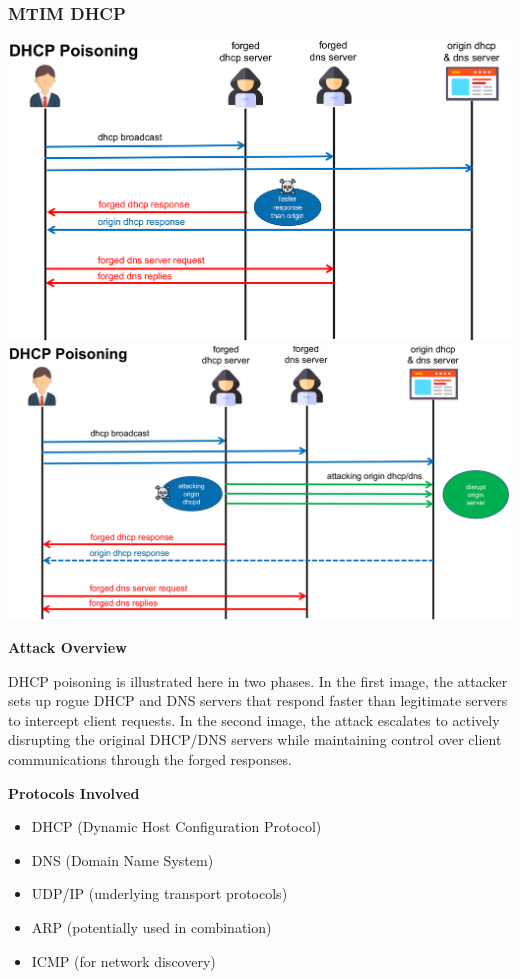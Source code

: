 \subsubsection{MTIM DHCP}
\begin{center}
\includegraphics[width=\textwidth]{resources/07-dhcp-1.png}
\includegraphics[width=\textwidth]{resources/07-dhcp-2.png}
\end{center}
\textbf{Attack Overview}

DHCP poisoning is illustrated here in two phases. In the first image, the attacker sets up rogue DHCP and DNS servers that respond faster than legitimate servers to intercept client requests. In the second image, the attack escalates to actively disrupting the original DHCP/DNS servers while maintaining control over client communications through the forged responses.

\textbf{Protocols Involved}
\begin{itemize}
    \item DHCP (Dynamic Host Configuration Protocol)
    \item DNS (Domain Name System)
    \item UDP/IP (underlying transport protocols)
    \item ARP (potentially used in combination)
    \item ICMP (for network discovery)
\end{itemize}


